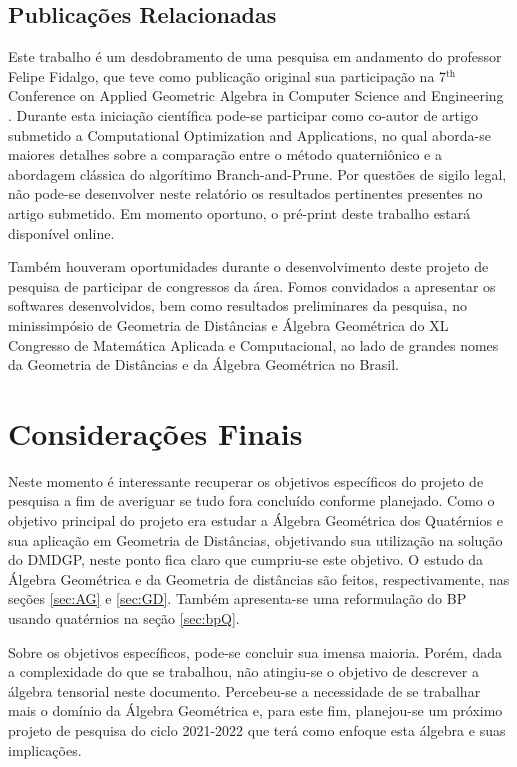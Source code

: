 \documentclass[a4paper,12pt]{report}
\theoremstyle{plain}
\theoremstyle{definition}
\begin{document}
	\section{Publicações Relacionadas}
	Este trabalho é um desdobramento de uma pesquisa em andamento do professor Felipe Fidalgo, que teve como publicação original sua participação na 7$^{\text{th}}$ Conference on Applied Geometric Algebra in Computer Science and Engineering \cite{fidalgoAGACSE}. Durante esta iniciação científica pode-se participar como co-autor de artigo submetido a Computational Optimization and Applications, no qual aborda-se maiores detalhes sobre a comparação entre o método quaterniônico e a abordagem clássica do algorítimo Branch-and-Prune. Por questões de sigilo legal, não pode-se desenvolver neste relatório os resultados pertinentes presentes no artigo submetido. Em momento oportuno, o pré-print deste trabalho estará disponível online.
	
	Também houveram oportunidades durante o desenvolvimento deste projeto de pesquisa de participar de congressos da área. Fomos convidados a apresentar os softwares desenvolvidos, bem como resultados preliminares da pesquisa, no minissimpósio de Geometria de Distâncias e Álgebra Geométrica do XL Congresso de Matemática Aplicada e Computacional, ao lado de grandes nomes da Geometria de Distâncias e da Álgebra Geométrica no Brasil.
	
	\chapter{Considerações Finais}
	
	Neste momento é interessante recuperar os objetivos específicos do projeto de pesquisa a fim de averiguar se tudo fora concluído conforme planejado. Como o objetivo principal do projeto era estudar a Álgebra Geométrica dos Quatérnios e sua aplicação em Geometria de Distâncias, objetivando sua utilização na solução do DMDGP, neste ponto fica claro que cumpriu-se este objetivo. O estudo da Álgebra Geométrica e da Geometria de distâncias são feitos, respectivamente, nas seções \ref{sec:AG} e \ref{sec:GD}. Também apresenta-se uma reformulação do BP usando quatérnios na seção \ref{sec:bpQ}.
	
	Sobre os objetivos específicos, pode-se concluir sua imensa maioria. Porém, dada a complexidade do que se trabalhou, não atingiu-se o objetivo de descrever a álgebra tensorial neste documento. Percebeu-se a necessidade de se trabalhar mais o domínio da Álgebra Geométrica e, para este fim, planejou-se um próximo projeto de pesquisa do ciclo 2021-2022 que terá como enfoque esta álgebra e suas implicações.
	
\end{document}
